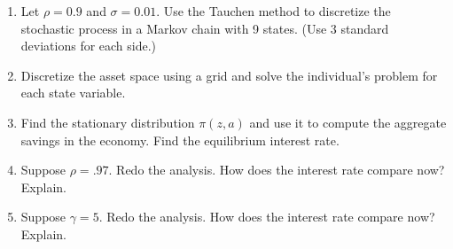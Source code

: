 \documentclass[10pt]{article}
\newcommand\0{\mathbf{0}}
\newcounter{exercise}
\newcounter{problem}[exercise]
\begin{document}
\begin{enumerate}[wide, label = \arabic*.]

\item Let $\rho = 0.9$ and $\sigma = 0.01$. Use the Tauchen method to discretize the stochastic process in a Markov chain with 9 states. (Use 3 standard deviations for each side.)


\item Discretize the asset space using a grid and solve the individual's problem for each state variable. 


\item Find the stationary distribution $\pi(z,a)$ and use it to compute the aggregate savings in the economy. Find the equilibrium interest rate.


\item Suppose $\rho = .97$. Redo the analysis. How does the interest rate compare now? Explain.


\item Suppose $\gamma = 5$. Redo the analysis. How does the interest rate compare now? Explain.

\end{enumerate}
\end{document}
